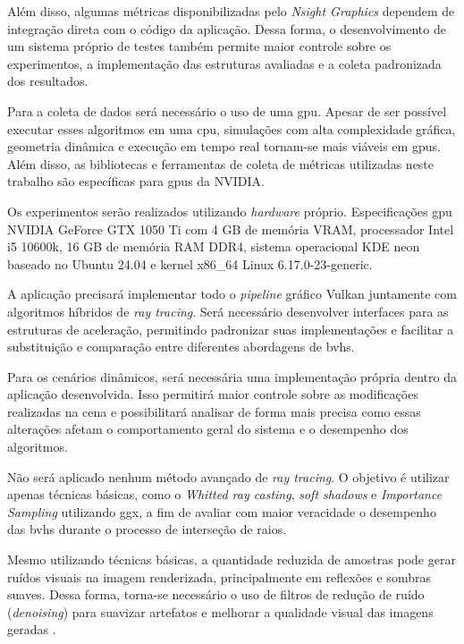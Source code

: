 Além disso, algumas métricas disponibilizadas pelo \textit{Nsight Graphics} dependem de integração direta com o código da aplicação. Dessa forma, o desenvolvimento de um sistema próprio de testes também permite maior controle sobre os experimentos, a implementação das estruturas avaliadas e a coleta padronizada dos resultados.

Para a coleta de dados será necessário o uso de uma \gls{gpu}. Apesar de ser possível executar esses algoritmos em uma \gls{cpu}, simulações com alta complexidade gráfica, geometria dinâmica e execução em tempo real tornam-se mais viáveis em \glspl{gpu}. Além disso, as bibliotecas e ferramentas de coleta de métricas utilizadas neste trabalho são específicas para \glspl{gpu} da NVIDIA.

Os experimentos serão realizados utilizando \textit{hardware} próprio. Especificações \gls{gpu} NVIDIA GeForce GTX 1050 Ti com 4 GB de memória VRAM, processador Intel i5 10600k, 16 GB de memória RAM DDR4, sistema operacional KDE neon baseado no Ubuntu 24.04 e kernel x86\_64 Linux 6.17.0-23-generic.

A aplicação precisará implementar todo o \textit{pipeline} gráfico Vulkan juntamente com algoritmos híbridos de \textit{ray tracing}. Será necessário desenvolver interfaces para as estruturas de aceleração, permitindo padronizar suas implementações e facilitar a substituição e comparação entre diferentes abordagens de \glspl{bvh}.

Para os cenários dinâmicos, será necessária uma implementação própria dentro da aplicação desenvolvida. Isso permitirá maior controle sobre as modificações realizadas na cena e possibilitará analisar de forma mais precisa como essas alterações afetam o comportamento geral do sistema e o desempenho dos algoritmos.

Não será aplicado nenhum método avançado de \textit{ray tracing}. O objetivo é utilizar apenas técnicas básicas, como o \textit{Whitted ray casting}, \textit{soft shadows} e \textit{Importance Sampling} utilizando \gls{ggx}, a fim de avaliar com maior veracidade o desempenho das \glspl{bvh} durante o processo de interseção de raios.

Mesmo utilizando técnicas básicas, a quantidade reduzida de amostras pode gerar ruídos visuais na imagem renderizada, principalmente em reflexões e sombras suaves. Dessa forma, torna-se necessário o uso de filtros de redução de ruído (\textit{denoising}) para suavizar artefatos e melhorar a qualidade visual das imagens geradas \cite{akenine2019real}.


